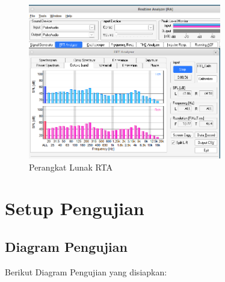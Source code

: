 \documentclass{article}
\begin{document}
\begin{itemize}
		\begin{figure}[H]
			\centering
			\includegraphics[width=0.75\textwidth,angle=0]{images/rta_fft}
			\caption{Perangkat Lunak RTA}
		\end{figure}

	\end{itemize}

	\newpage

	\section{Setup Pengujian}

	\subsection{Diagram Pengujian}

	Berikut Diagram Pengujian yang disiapkan:

\end{document}
